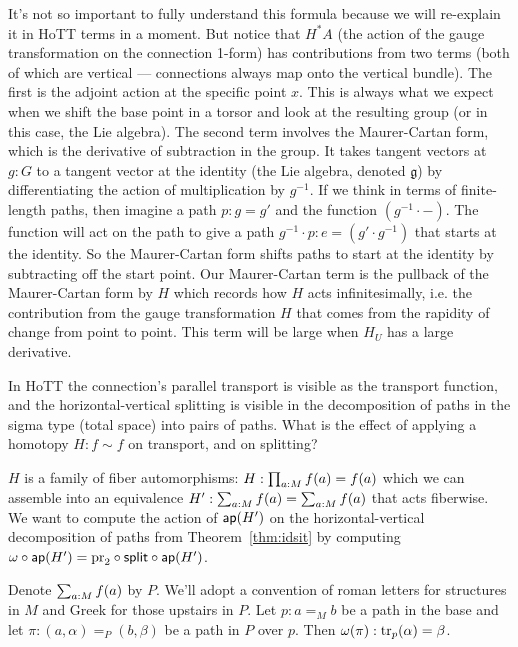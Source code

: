 \documentclass[12pt]{article}
\begin{document}
It's not so important to fully understand this formula because we will re-explain it in HoTT terms in a moment. But notice that \( H^*A \) (the action of the gauge transformation on the connection 1-form) has contributions from two terms (both of which are vertical --- connections always map onto the vertical bundle). The first is the adjoint action at the specific point \( x \). This is always what we expect when we shift the base point in a torsor and look at the resulting group (or in this case, the Lie algebra). The second term involves the Maurer-Cartan form, which is the derivative of subtraction in the group. It takes tangent vectors at \( g:G \) to a tangent vector at the identity (the Lie algebra, denoted \( \mathfrak{g} \)) by differentiating the action of multiplication by \( g^{-1} \). If we think in terms of finite-length paths, then imagine a path \( p:g=g' \) and the function \( (g^{-1}\cdot -) \). The function will act on the path to give a path \( g^{-1}\cdot p:e=(g'\cdot g^{-1}) \) that starts at the identity. So the Maurer-Cartan form shifts paths to start at the identity by subtracting off the start point. Our Maurer-Cartan term is the pullback of the Maurer-Cartan form by \( H \) which records how \( H \) acts infinitesimally, i.e. the contribution from the gauge transformation \( H \) that comes from the rapidity of change from point to point. This term will be large when \( H_U \) has a large derivative.

In HoTT the connection's parallel transport is visible as the transport function, and the horizontal-vertical splitting is visible in the decomposition of paths in the sigma type (total space) into pairs of paths. What is the effect of applying a homotopy \( H:f\sim f \) on transport, and on splitting?

\( H \) is a family of fiber automorphisms: \( H:\prod_{a:M}f(a)=f(a) \) which we can assemble into an equivalence \( H':\sum_{a:M}f(a)=\sum_{a:M}f(a) \) that acts fiberwise. We want to compute the action of \( \mathsf{ap}(H') \) on the horizontal-vertical decomposition of paths from Theorem~\ref{thm:idsit} by computing \( \omega\circ\mathsf{ap}(H')=\mathrm{pr}_2\circ\mathsf{split}\circ\mathsf{ap}(H') \).

Denote \( \sum_{a:M}f(a) \) by \( P \). We'll adopt a convention of roman letters for structures in \( M \) and Greek for those upstairs in \( P \). Let \( p:a=_M b \) be a path in the base and let \( \pi:(a,\alpha)=_P (b,\beta) \) be a path in \( P \) over \( p \). Then \( \omega(\pi):\mathrm{tr}_p(\alpha)=\beta \).
\end{document}
